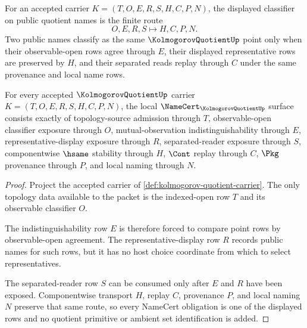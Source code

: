 \begin{definition}
\label{def:kolmogorov-quotient-classifier}
For an accepted carrier $K=(T,O,E,R,S,H,C,P,N)$, the displayed classifier on public quotient names is the finite route
$$
O,E,R,S \longmapsto H,C,P,N .
$$
Two public names classify as the same $\KolmogorovQuotientUp$ point only when their observable-open rows agree through $E$, their displayed representative rows are preserved by $H$, and their separated reads replay through $C$ under the same provenance and local name rows.
\end{definition}

\begin{theorem}
\label{thm:kolmogorov-quotient-namecert-obligations}
For every accepted $\KolmogorovQuotientUp$ carrier $K=(T,O,E,R,S,H,C,P,N)$, the local $\NameCert_{\KolmogorovQuotientUp}$ surface consists exactly of topology-source admission through $T$, observable-open classifier exposure through $O$, mutual-observation indistinguishability through $E$, representative-display exposure through $R$, separated-reader exposure through $S$, componentwise $\hsame$ stability through $H$, $\Cont$ replay through $C$, $\Pkg$ provenance through $P$, and local naming through $N$.
\end{theorem}
\begin{proof}
Project the accepted carrier of \autoref{def:kolmogorov-quotient-carrier}. The only topology data available to the packet is the indexed-open row $T$ and its observable classifier $O$.

The indistinguishability row $E$ is therefore forced to compare point rows by observable-open agreement. The representative-display row $R$ records public names for such rows, but it has no host choice coordinate from which to select representatives.

The separated-reader row $S$ can be consumed only after $E$ and $R$ have been exposed. Componentwise transport $H$, replay $C$, provenance $P$, and local naming $N$ preserve that same route, so every NameCert obligation is one of the displayed rows and no quotient primitive or ambient set identification is added.
\end{proof}

